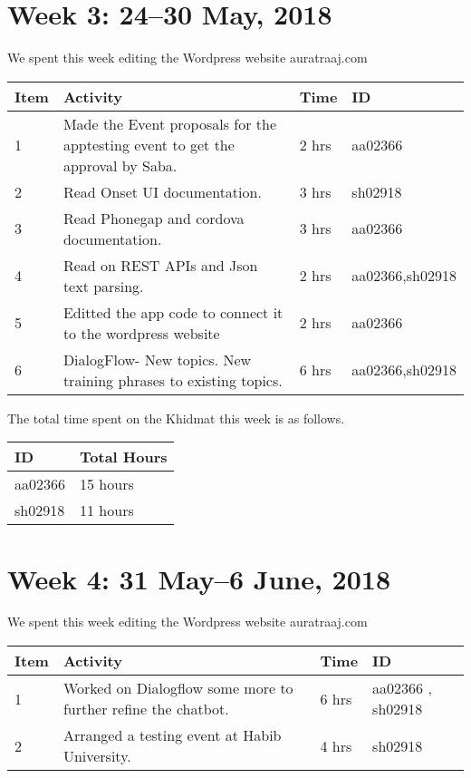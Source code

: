 \documentclass{article}
\begin{document}
\newpage %
\section*{Week 3: 24--30 May, 2018}

We spent this week editing the Wordpress website auratraaj.com

\begin{tabular}{|l|l|l|l|}
  \hline
  Item 	& Activity & Time & ID \\\hline\hline
  1	& Made the Event proposals for the apptesting event to get the approval by Saba. & 2 hrs & aa02366 \\\hline
  2	& Read Onset UI documentation. & 3 hrs & sh02918 
  \\\hline
  3	& Read Phonegap and cordova documentation. & 3 hrs & aa02366 \\\hline
  4	& Read on REST APIs and Json text parsing. & 2 hrs & aa02366,sh02918 \\\hline  
  5	& Editted the app code to connect it to the wordpress website & 2 hrs & aa02366 
  \\\hline
  6	& DialogFlow- New topics. New training phrases to existing topics. & 6 hrs & aa02366,sh02918 \\\hline

\end{tabular}

The total time spent on the Khidmat this week is as follows.

\begin{tabular}{|l|l|}
  \hline
  ID & Total Hours\\\hline\hline
  aa02366 & 15 hours\\\hline
  sh02918 & 11 hours\\\hline
\end{tabular}



\newpage %
\section*{Week 4: 31 May--6 June, 2018}

We spent this week editing the Wordpress website auratraaj.com

\begin{tabular}{|l|l|l|l|}
  \hline
  Item 	& Activity & Time & ID \\\hline\hline
  1	& Worked on Dialogflow some more to further refine the chatbot. & 6 hrs & aa02366 , sh02918 \\\hline
  2	& Arranged a testing event at Habib University. & 4 hrs & sh02918 \\\hline
  

\end{tabular}
\end{document}
